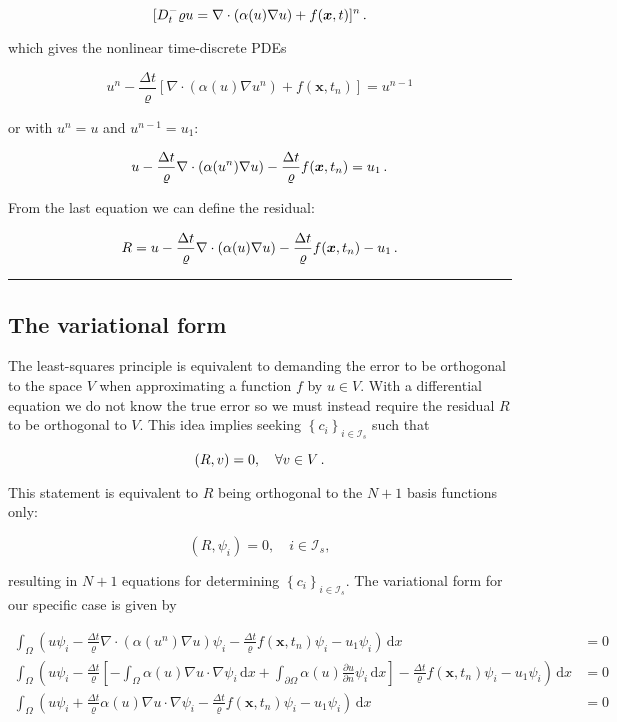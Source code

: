 \documentclass[letterpaper,10pt,english]{/usr/share/sphinx/texinputs/sphinxhowto}
\begin{document}
\[
[D_t^- \varrho u = \nabla\cdot (\alpha (u)\nabla u) + f(\boldsymbol{x}, t)]^n
{\thinspace .}
\]

which gives the nonlinear time-discrete PDEs

\[
u^{n} - \frac{\Delta t}{\varrho} \left[ \nabla\cdot (\alpha (u)\nabla u^n) + f(\boldsymbol{x}, t_{n})\right] = {u}^{n-1}
\]

or with $u^n = u$ and $u^{n-1} = u_1$:

\[
u - \frac{\Delta t}{\varrho}\nabla\cdot({\alpha}(u^n)\nabla u) -\frac{\Delta t}{\varrho} f(\boldsymbol{x}, t_{n}) = u_1{\thinspace .}
\]

From the last equation we can define the residual:

\[
R = u - \frac{\Delta t}{\varrho}\nabla\cdot({\alpha}(u)\nabla u) -\frac{\Delta t}{\varrho} f(\boldsymbol{x}, t_{n}) - u_1{\thinspace .}
\]\begin{center}\rule{3in}{0.4pt}\end{center}

\subsection{The variational form}The least-squares principle is equivalent to demanding the error to be
orthogonal to the space $V$ when approximating a function $f$ by
$u \in V$. With a differential equation we do not know the true error so
we must instead require the residual $R$ to be orthogonal to $V$. This
idea implies seeking $\left\{ {c}_i \right\}_{i\in{\mathcal{I}_s}}$ such
that

\[
(R,v)=0,\quad \forall v\in V{\thinspace .}
\]

This statement is equivalent to $R$ being orthogonal to the $N+1$ basis
functions only:

\[
(R,{\psi}_i)=0,\quad i\in{\mathcal{I}_s},
\]

resulting in $N+1$ equations for determining
$\left\{ {c}_i \right\}_{i\in{\mathcal{I}_s}}$. The variational form for
our specific case is given by

\begin{align*}
\int_\Omega (u{\psi}_i - \frac{\Delta t}{\varrho}\nabla\cdot({\alpha}(u^n)\nabla u) {\psi}_i  - \frac{\Delta t}{\varrho} f(\boldsymbol{x}, t_{n}){\psi}_i - u_1{\psi}_i){\, \mathrm{d}x} &= 0\\
\int_\Omega (u{\psi}_i - \frac{\Delta t}{\varrho} \left[
-\int_{\Omega}{\alpha(u)}\nabla u\cdot\nabla{\psi}_i{\, \mathrm{d}x} +
\int_{\partial\Omega}{\alpha(u)}\frac{\partial u}{\partial n}{\psi}_i {\, \mathrm{d}x} \right]
- \frac{\Delta t}{\varrho} f(\boldsymbol{x}, t_{n}){\psi}_i - u_1{\psi}_i){\, \mathrm{d}x} &= 0\\
\int_\Omega (u{\psi}_i + \frac{\Delta t}{\varrho}{\alpha}(u)\nabla u\cdot\nabla {\psi}_i  - \frac{\Delta t}{\varrho} f(\boldsymbol{x}, t_{n}){\psi}_i - u_1{\psi}_i){\, \mathrm{d}x} &= 0
\end{align*}
\end{document}
